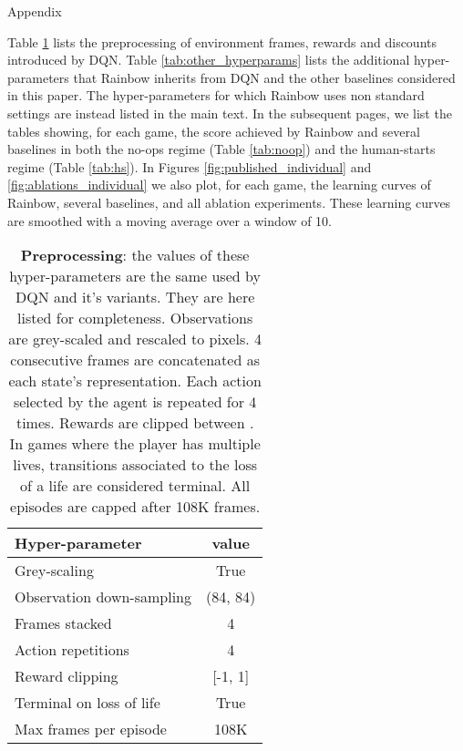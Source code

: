\documentclass[letterpaper]{article} \usepackage{aaai18}  \usepackage{times}  \usepackage{helvet}  \usepackage{courier}  \usepackage{url}  \usepackage{graphicx}  \usepackage{amsmath,amssymb}
\begin{document}




\onecolumn
\begin{center}
{\Huge{Appendix}}\\
\end{center}
\vspace{1.5cm}
Table \ref{tab:preprocess} lists the preprocessing of environment frames, rewards and discounts introduced by DQN. Table \ref{tab:other_hyperparams} lists the additional hyper-parameters that Rainbow inherits from DQN and the other baselines considered in this paper. The hyper-parameters for which Rainbow uses non standard settings are instead listed in the main text. In the subsequent pages, we list the tables showing, for each game, the score achieved by Rainbow and several baselines in both the no-ops regime (Table \ref{tab:noop}) and the human-starts regime (Table \ref{tab:hs}). In Figures \ref{fig:published_individual} and \ref{fig:ablations_individual} we also plot, for each game, the learning curves of Rainbow, several baselines, and all ablation experiments. These learning curves are smoothed with a moving average over a window of 10.

\vspace{6em}


\begin{table}[h!]
\centering
\begin{tabular}{ l | c }
\hline
Hyper-parameter           & value \\
\hline
 Grey-scaling           & True \\
 Observation down-sampling      & (84, 84) \\ 
 Frames stacked         &  4 \\
 Action repetitions        &  4 \\
 Reward clipping        & [-1, 1] \\
 Terminal on loss of life & True \\
 Max frames per episode & 108K \\
\hline

\end{tabular}
\caption{\textbf{Preprocessing}: the values of these hyper-parameters are the same used by DQN and it’s variants. They are here listed for completeness. Observations are grey-scaled and rescaled to  pixels. 4 consecutive frames are concatenated as each state's representation. Each action selected by the agent is repeated for 4 times. Rewards are clipped between . In games where the player has multiple lives, transitions associated to the loss of a life are considered terminal. All episodes are capped after 108K frames.
}
\label{tab:preprocess}
\end{table}
\end{document}
